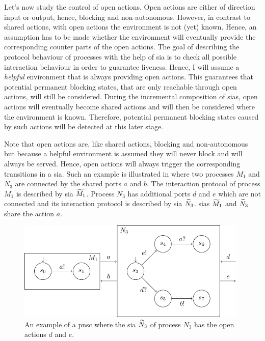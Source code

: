 Let's now study the control of open actions.
Open actions are either of direction input or output, hence, blocking and non-autonomous.
However, in contrast to shared actions, with open actions the environment is not (yet) known.
Hence, an assumption has to be made whether the environment will eventually provide the corresponding counter parts of the open actions.
The goal of describing the protocol behaviour of processes with the help of \gls{sia} is to check all possible interaction behaviour in order to guarantee liveness.
Hence, I will assume a \emph{helpful} environment that is always providing open actions.
This guarantees that potential permanent blocking states, that are only reachable through open actions, will still be considered.
During the incremental composition of \glspl{sia}, open actions will eventually become shared actions and will then be considered where the environment is known.
Therefore, potential permanent blocking states caused by such actions will be detected at this later stage.

Note that open actions are, like shared actions, blocking and non-autonomous but because a helpful environment is assumed they will never block and will always be served.
Hence, open actions will always trigger the corresponding transitions in a \gls{sia}.
Such an example is illustrated in \Fig{\ref{fig_sia_control_open}} where two processes $M_1$ and $N_3$ are connected by the shared ports $a$ and $b$.
The interaction protocol of process $M_1$ is described by \gls{sia} $\widetilde{M}_1$.
Process $N_3$ has additional ports $d$ and $e$ which are not connected and its interaction protocol is described by \gls{sia} $\widetilde{N}_3$.
\Glspl{sia} $\widetilde{M}_1$ and $\widetilde{N}_3$ share the action $a$.
\begin{figure}[bht]
    \TopFigSpace
    \centering
    \includegraphics[width=11cm]{fig/sia_control_open.pdf}
    \CaptionFigSpace
    \caption{An example of a \gls{pnsc} where the \gls{sia} $\widetilde{N}_3$ of process $N_3$ has the open actions $d$ and $e$.}
    \label{fig_sia_control_open}
    \BotFigSpace
\end{figure}

